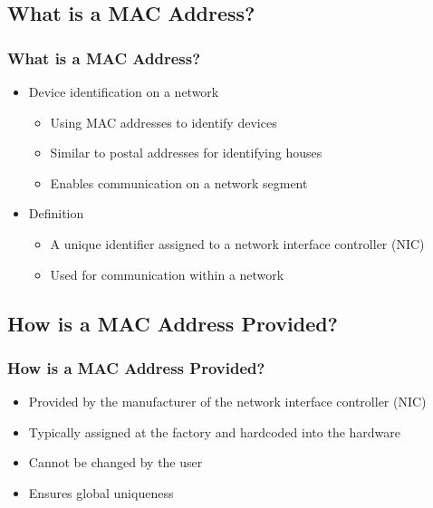 \documentclass[
	11pt, %
]{beamer}
\begin{document}
\begin{frame}
  \section{What is a MAC Address?}
  \frametitle{What is a MAC Address?}
  \begin{itemize}
    \item Device identification on a network \pause
      \begin{itemize}
        \item Using MAC addresses to identify devices \pause
        \item Similar to postal addresses for identifying houses \pause
        \item Enables communication on a network segment \pause
      \end{itemize}
    \item Definition \pause
      \begin{itemize}
        \item A unique identifier assigned to a network interface controller (NIC) \pause
        \item Used for communication within a network 
      \end{itemize}
  \end{itemize}
\end{frame}

\begin{frame}
  \section{How is a MAC Address Provided?}
  \frametitle{How is a MAC Address Provided?}
  \begin{itemize}
    \item Provided by the manufacturer of the network interface controller (NIC) \pause
    \item Typically assigned at the factory and hardcoded into the hardware \pause
    \item Cannot be changed by the user \pause
    \item Ensures global uniqueness 
  \end{itemize}
\end{frame}
\end{document}
